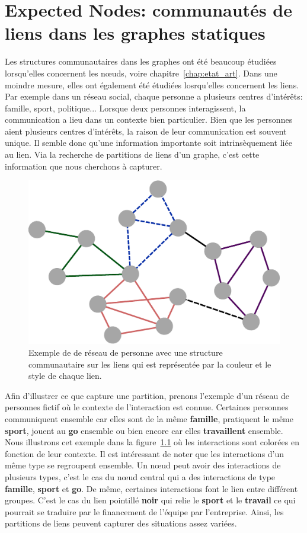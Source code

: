\chapter{Expected Nodes: communautés de liens dans les graphes statiques}
\minitoc

\label{chap:Expected_Node}
Les structures communautaires dans les graphes ont été beaucoup étudiées lorsqu'elles concernent les n\oe uds, voire chapitre~\ref{chap:etat_art}.
Dans une moindre mesure, elles ont également été étudiées losrqu'elles concernent les liens.
Par exemple dans un réseau social, chaque personne a plusieurs centres d'intérêts: famille, sport, politique...
Lorsque deux personnes interagissent, la communication a lieu dans un contexte bien particulier.
Bien que les personnes aient plusieurs centres d'intérêts, la raison de leur communication est souvent unique.
Il semble donc qu'une information importante soit intrinsèquement liée au lien.
Via la recherche de partitions de liens d'un graphe, c'est cette information que nous cherchons à capturer.

\begin{figure}
\centering
\includegraphics[width=0.5\linewidth]{img/ExpectedNodes/Link_Partition}
\caption{Exemple de de réseau de personne avec une structure communautaire sur les liens qui est représentée par la couleur et le style de chaque lien.}
\label{fig:linkpartition_exemple_expected}
\end{figure}
Afin d'illustrer ce que capture une partition, prenons l'exemple d'un réseau de personnes fictif où le contexte de l'interaction est connue.
Certaines personnes communiquent ensemble car elles sont de la même \textbf{\textcolor{bleu_random}{famille}}, pratiquent le même \textbf{\textcolor{rose_cochon}{sport}}, jouent au \textbf{\textcolor{vert_fonce}{go}} ensemble ou bien encore car elles \textbf{\textcolor{violet_cool}{travaillent}} ensemble.
Nous illustrons cet exemple dans la figure~\ref{fig:linkpartition_exemple_expected} où les interactions sont colorées en fonction de leur contexte.
Il est intéressant de noter que les interactions d'un même type se regroupent ensemble.
Un n\oe ud peut avoir des interactions de plusieurs types, c'est le cas du n\oe ud central qui a des interactions de type \textbf{\textcolor{bleu_random}{famille}}, \textbf{\textcolor{rose_cochon}{sport}} et \textbf{\textcolor{vert_fonce}{go}}.
De même, certaines interactions font le lien entre différent groupes.
C'est le cas du lien pointillé \textbf{noir} qui relie le \textbf{\textcolor{rose_cochon}{sport}} et le \textbf{\textcolor{violet_cool}{travail}} ce qui pourrait se traduire par le financement de l'équipe par l'entreprise.
Ainsi, les partitions de liens peuvent capturer des situations assez variées.

